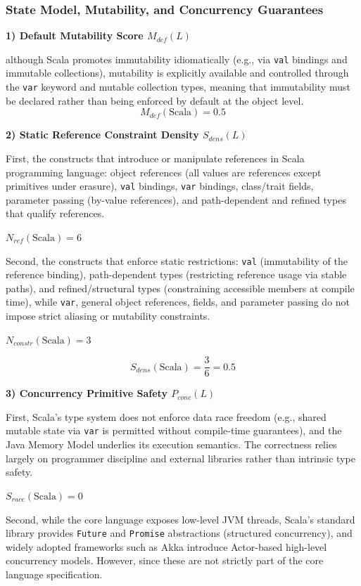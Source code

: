 \subsubsection{State Model, Mutability, and Concurrency Guarantees}

\textbf{1) Default Mutability Score $M_{def}(L)$}

although Scala promotes immutability idiomatically (e.g., via \texttt{val} bindings and immutable collections), mutability is explicitly available and controlled through the \texttt{var} keyword and mutable collection types, meaning that immutability must be declared rather than being enforced by default at the object level.
\[
    M_{def}(\text{Scala}) = 0.5
\]

\textbf{2) Static Reference Constraint Density $S_{dens}(L)$}

First, the constructs that introduce or manipulate references in Scala programming language: object references (all values are references except primitives under erasure), \texttt{val} bindings, \texttt{var} bindings, class/trait fields, parameter passing (by-value references), and path-dependent and refined types that qualify references.

$N_{ref}(\text{Scala})=6$

Second, the constructs that enforce static restrictions: \texttt{val} (immutability of the reference binding), path-dependent types (restricting reference usage via stable paths), and refined/structural types (constraining accessible members at compile time), while \texttt{var}, general object references, fields, and parameter passing do not impose strict aliasing or mutability constraints.

$N_{constr}(\text{Scala})=3$

\[
    S_{dens}(\text{Scala}) = \frac{3}{6} = 0.5
\]

\textbf{3) Concurrency Primitive Safety $P_{conc}(L)$}

First, Scala’s type system does not enforce data race freedom (e.g., shared mutable state via \texttt{var} is permitted without compile-time guarantees), and the Java Memory Model underlies its execution semantics. The correctness relies largely on programmer discipline and external libraries rather than intrinsic type safety.

$S_{race}(\text{Scala}) = 0$

Second, while the core language exposes low-level JVM threads, Scala’s standard library provides \texttt{Future} and \texttt{Promise} abstractions (structured concurrency), and widely adopted frameworks such as Akka introduce Actor-based high-level concurrency models. However, since these are not strictly part of the core language specification.

